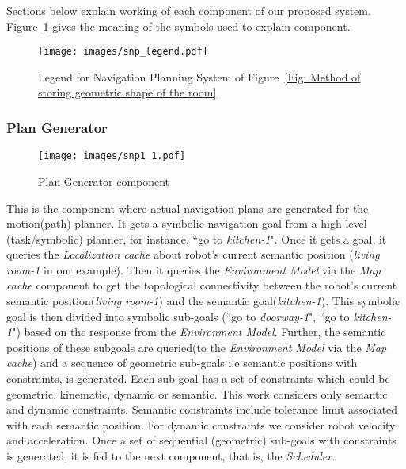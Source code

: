 Sections below explain working of each component of our proposed system. Figure~\ref{fig:legend} gives the meaning of the symbols used to explain component.
\begin{figure}[htbp] %
   \centering
   \texttt{[image: images/snp\_legend.pdf]}
   \caption{Legend for Navigation Planning System of Figure~\ref{Fig: Method of storing geometric shape of the room}}
   \label{fig:legend}
\end{figure}

\subsubsection{Plan Generator}
\begin{figure}[htbp] %
   \centering
   \texttt{[image: images/snp1\_1.pdf]}
   \caption{Plan Generator component}
   \label{Fig:Data flow summery}
\end{figure}
This is the component where actual navigation plans are generated for the motion(path) planner.
It gets a symbolic navigation goal from a high level (task/symbolic) planner, for instance, ``go to \textit{kitchen-1}".
Once it gets a goal, it queries the \textit{Localization cache} about robot's current semantic position (\textit{living room-1} in our example).
Then it queries the \textit{Environment Model} via the \textit{Map cache} component to get the topological connectivity between 
the robot's current semantic position(\textit{living room-1}) and the semantic goal(\textit{kitchen-1}).
This symbolic goal is then divided into symbolic sub-goals (``go to \textit{doorway-1}", ``go to \textit{kitchen-1}") based on the response 
from the \textit{Environment Model}.
Further, the semantic positions of these subgoals are queried(to the \textit{Environment Model} via the \textit{Map cache}) and a sequence of geometric sub-goals i.e semantic positions with constraints, is generated. 
Each sub-goal has a set of constraints which could be geometric, kinematic, dynamic or semantic. 
This work considers only semantic and dynamic constraints.
Semantic constraints include tolerance limit associated with each semantic position.
For dynamic constraints we consider robot velocity and acceleration.
Once a set of sequential (geometric) sub-goals with constraints is generated, it is fed to the next component, that is, the \textit{Scheduler}.  

